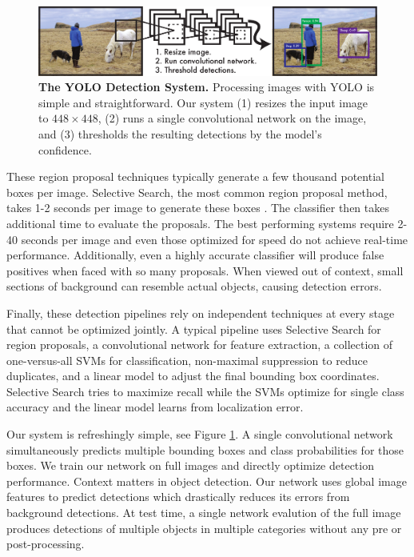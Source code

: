 \documentclass{article} %
\begin{document}
\begin{figure}[t]
\begin{center}
        \includegraphics[width=\linewidth]{system2}
\end{center}
   \caption{\small \textbf{The YOLO Detection System.} Processing images with YOLO is simple and straightforward. Our system (1) resizes the input image to $448 \times 448$, (2) runs a single convolutional network on the image, and (3) thresholds the resulting detections by the model's confidence.}
\label{system}
\end{figure}

These region proposal techniques typically generate a few thousand potential boxes per image. Selective Search, the most common region proposal method, takes 1-2 seconds per image to generate these boxes \cite{uijlings2013selective}. The classifier then takes additional time to evaluate the proposals. The best performing systems require 2-40 seconds per image and even those optimized for speed do not achieve real-time performance. Additionally, even a highly accurate classifier will produce false positives when faced with so many proposals. When viewed out of context, small sections of background can resemble actual objects, causing detection errors.

Finally, these detection pipelines rely on independent techniques at every stage that cannot be optimized jointly. A typical pipeline uses Selective Search for region proposals, a convolutional network for feature extraction, a collection of one-versus-all SVMs for classification, non-maximal suppression to reduce duplicates, and a linear model to adjust the final bounding box coordinates. Selective Search tries to maximize recall while the SVMs optimize for single class accuracy and the linear model learns from localization error.

Our system is refreshingly simple, see Figure \ref{system}. A single convolutional network simultaneously predicts multiple bounding boxes and class probabilities for those boxes. We train our network on full images and directly optimize detection performance. Context matters in object detection. Our network uses global image features to predict detections which drastically reduces its errors from background detections. At test time, a single network evalution of the full image produces detections of multiple objects in multiple categories without any pre or post-processing.
\end{document}
